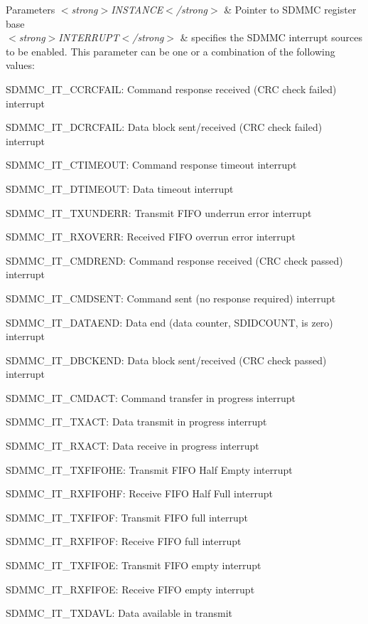 \begin{DoxyParams}{Parameters}
{\em $<$strong$>$\+I\+N\+S\+T\+A\+N\+C\+E$<$/strong$>$} & Pointer to S\+D\+M\+MC register base\\
\hline
{\em $<$strong$>$\+I\+N\+T\+E\+R\+R\+U\+P\+T$<$/strong$>$} & specifies the S\+D\+M\+MC interrupt sources to be enabled. This parameter can be one or a combination of the following values\+: \begin{DoxyItemize}
\item S\+D\+M\+M\+C\+\_\+\+I\+T\+\_\+\+C\+C\+R\+C\+F\+A\+IL\+: Command response received (C\+RC check failed) interrupt \item S\+D\+M\+M\+C\+\_\+\+I\+T\+\_\+\+D\+C\+R\+C\+F\+A\+IL\+: Data block sent/received (C\+RC check failed) interrupt \item S\+D\+M\+M\+C\+\_\+\+I\+T\+\_\+\+C\+T\+I\+M\+E\+O\+UT\+: Command response timeout interrupt \item S\+D\+M\+M\+C\+\_\+\+I\+T\+\_\+\+D\+T\+I\+M\+E\+O\+UT\+: Data timeout interrupt \item S\+D\+M\+M\+C\+\_\+\+I\+T\+\_\+\+T\+X\+U\+N\+D\+E\+RR\+: Transmit F\+I\+FO underrun error interrupt \item S\+D\+M\+M\+C\+\_\+\+I\+T\+\_\+\+R\+X\+O\+V\+E\+RR\+: Received F\+I\+FO overrun error interrupt \item S\+D\+M\+M\+C\+\_\+\+I\+T\+\_\+\+C\+M\+D\+R\+E\+ND\+: Command response received (C\+RC check passed) interrupt \item S\+D\+M\+M\+C\+\_\+\+I\+T\+\_\+\+C\+M\+D\+S\+E\+NT\+: Command sent (no response required) interrupt \item S\+D\+M\+M\+C\+\_\+\+I\+T\+\_\+\+D\+A\+T\+A\+E\+ND\+: Data end (data counter, S\+D\+I\+D\+C\+O\+U\+NT, is zero) interrupt \item S\+D\+M\+M\+C\+\_\+\+I\+T\+\_\+\+D\+B\+C\+K\+E\+ND\+: Data block sent/received (C\+RC check passed) interrupt \item S\+D\+M\+M\+C\+\_\+\+I\+T\+\_\+\+C\+M\+D\+A\+CT\+: Command transfer in progress interrupt \item S\+D\+M\+M\+C\+\_\+\+I\+T\+\_\+\+T\+X\+A\+CT\+: Data transmit in progress interrupt \item S\+D\+M\+M\+C\+\_\+\+I\+T\+\_\+\+R\+X\+A\+CT\+: Data receive in progress interrupt \item S\+D\+M\+M\+C\+\_\+\+I\+T\+\_\+\+T\+X\+F\+I\+F\+O\+HE\+: Transmit F\+I\+FO Half Empty interrupt \item S\+D\+M\+M\+C\+\_\+\+I\+T\+\_\+\+R\+X\+F\+I\+F\+O\+HF\+: Receive F\+I\+FO Half Full interrupt \item S\+D\+M\+M\+C\+\_\+\+I\+T\+\_\+\+T\+X\+F\+I\+F\+OF\+: Transmit F\+I\+FO full interrupt \item S\+D\+M\+M\+C\+\_\+\+I\+T\+\_\+\+R\+X\+F\+I\+F\+OF\+: Receive F\+I\+FO full interrupt \item S\+D\+M\+M\+C\+\_\+\+I\+T\+\_\+\+T\+X\+F\+I\+F\+OE\+: Transmit F\+I\+FO empty interrupt \item S\+D\+M\+M\+C\+\_\+\+I\+T\+\_\+\+R\+X\+F\+I\+F\+OE\+: Receive F\+I\+FO empty interrupt \item S\+D\+M\+M\+C\+\_\+\+I\+T\+\_\+\+T\+X\+D\+A\+VL\+: Data available in transmit 
\end{DoxyItemize}
\end{DoxyParams}
